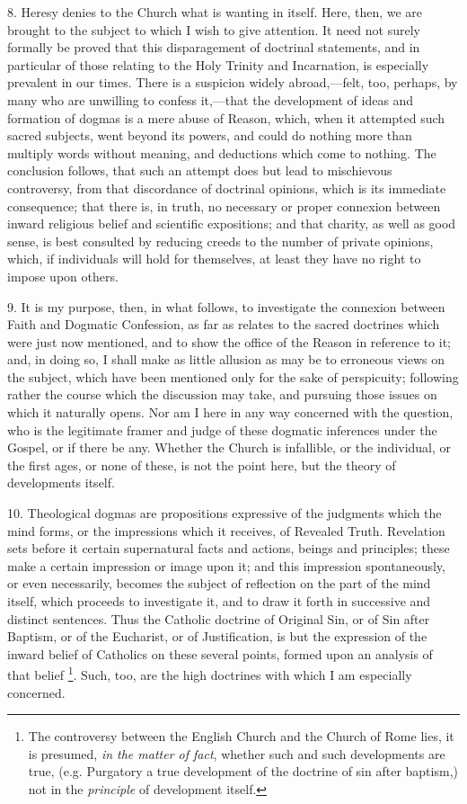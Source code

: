 8. Heresy denies to the Church what is wanting in itself. Here,
then, we are brought to the subject to which I wish to give attention.
It need not surely formally be proved that this disparagement of
doctrinal statements, and in particular of those relating to the Holy
Trinity and Incarnation, is especially prevalent in our times. There
is a suspicion widely abroad,—felt, too, perhaps, by many who are
unwilling to confess it,—that the development of ideas and formation
of dogmas is a mere abuse of Reason, which, when it attempted such
sacred subjects, went beyond its powers, and could do nothing more
than multiply words without meaning, and deductions which come to
nothing. The conclusion follows, that such an attempt does but lead to
mischievous controversy, from that discordance of doctrinal opinions,
which is its immediate consequence; that there is, in truth, no
necessary or proper connexion between inward religious belief and
scientific expositions; and that charity, as well as good sense, is
best consulted by reducing creeds to the number of private opinions,
which, if individuals will hold for themselves, at least they have no
right to impose upon others.

9. It is my purpose, then, in what follows, to investigate the
connexion between Faith and Dogmatic Confession, as far as relates to
the sacred doctrines which were just now mentioned, and to show the
office of the Reason in reference to it; and, in doing so, I shall
make as little allusion as may be to erroneous views on the subject,
which have been mentioned only for the sake of perspicuity; following
rather the course which the discussion may take, and pursuing those
issues on which it naturally opens. Nor am I here in any way concerned
with the question, who is the legitimate framer and judge of these
dogmatic inferences under the Gospel, or if there be any. Whether the
Church is infallible, or the individual, or the first ages, or none of
these, is not the point here, but the theory of developments itself.

10. Theological dogmas are propositions expressive of the judgments
which the mind forms, or the impressions which it receives, of
Revealed Truth. Revelation sets before it certain supernatural facts
and actions, beings and principles; these make a certain impression or
image upon it; and this impression spontaneously, or even necessarily,
becomes the subject of reflection on the part of the mind itself,
which proceeds to investigate it, and to draw it forth in successive
and distinct sentences. Thus the Catholic doctrine of Original Sin, or
of Sin after Baptism, or of the Eucharist, or of Justification, is but
the expression of the inward belief of Catholics on these several
points, formed upon an analysis of that belief \footnote{The controversy between the English Church and the Church of
Rome lies, it is presumed, \emph{in the matter of fact}, whether such
and such developments are true, (e.g. Purgatory a true development of
the doctrine of sin after baptism,) not in the \emph{principle} of
development itself.}. Such, too,
are the high doctrines with which I am especially concerned.

